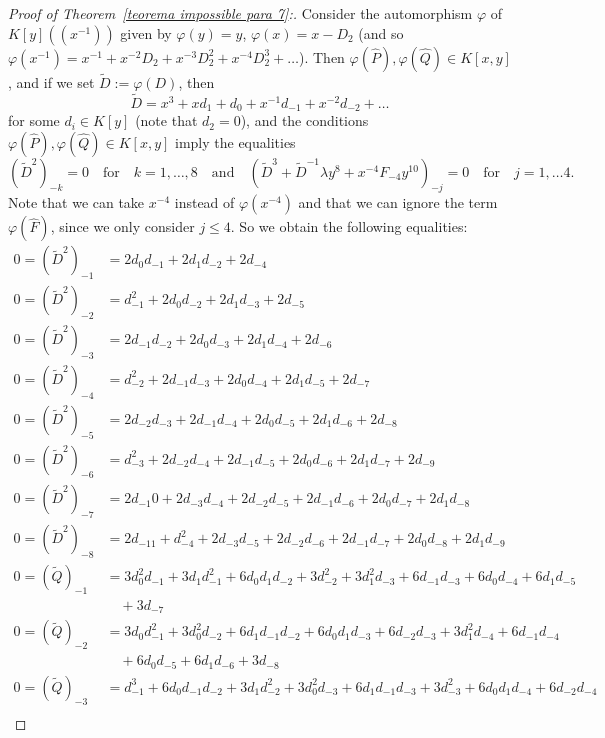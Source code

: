 \documentclass[reqno,a4paper,twoside]{amsart}
\theoremstyle{definition}
\theoremstyle{remark}
\begin{document}
\begin{proof}[Proof of Theorem~\ref{teorema impossible para 7}:]
Consider the automorphism $\varphi$ of $K[y]((x^{-1}))$ given by $\varphi(y)=y$, $\varphi(x)=x-D_2$ (and so $\varphi(x^{-1})=x^{-1}+x^{-2}D_2+x^{-3}D_2^2+x^{-4}D_2^3+\dots$).
Then $\varphi(\hat P),\varphi(\hat Q)\in K[x,y]$, and if we set $\tilde D:=\varphi(D)$, then
$$
\tilde D=x^3+x d_1 +d_0+x^{-1}d_{-1}+x^{-2}d_{-2}+\dots
$$
for some $d_i\in K[y]$ (note that $d_2=0$), and the conditions $\varphi(\hat P),\varphi(\hat Q)\in K[x,y]$ imply the equalities
$$
(\tilde D^2)_{-k}=0\quad\text{for}\quad k=1,\dots,8\quad\text{and}\quad (\tilde D^3+\tilde D^{-1}\lambda y^8+x^{-4}F_{-4}y^{10})_{-j}=0\quad\text{for}\quad j=1,\dots 4.
$$
Note that we can take $x^{-4}$ instead of $\varphi(x^{-4})$ and that we can ignore the term $\varphi(\hat F)$, since we only consider $j\le 4$.
So we obtain the following equalities:
\begin{align*}
  0=(\tilde D^2)_{-1} & = 2 d_0 d_{-1} + 2 d_1 d_{-2} + 2 d_{-4}\\
0=(\tilde D^2)_{-2} &= d_{-1}^2 + 2 d_0 d_{-2} + 2 d_1 d_{-3} + 2 d_{-5}\\
0=(\tilde D^2)_{-3} &= 2 d_{-1} d_{-2} + 2 d_0 d_{-3} + 2 d_1 d_{-4} + 2 d_{-6}\\
0=(\tilde D^2)_{-4} &= d_{-2}^2 + 2 d_{-1} d_{-3} + 2 d_0 d_{-4} + 2 d_1 d_{-5} + 2 d_{-7}\\
0=(\tilde D^2)_{-5} &= 2 d_{-2} d_{-3} + 2 d_{-1} d_{-4} + 2 d_0 d_{-5} + 2 d_1 d_{-6} + 2 d_{-8}\\
0=(\tilde D^2)_{-6} &= d_{-3}^2 + 2 d_{-2} d_{-4} + 2 d_{-1} d_{-5} + 2 d_0 d_{-6} + 2 d_1 d_{-7} + 2 d_{-9}\\
0=(\tilde D^2)_{-7} &= 2 d_{-1}0 + 2 d_{-3} d_{-4} + 2 d_{-2} d_{-5} + 2 d_{-1} d_{-6} + 2 d_0 d_{-7} +  2 d_1 d_{-8}\\
0=(\tilde D^2)_{-8} &= 2 d_{-11} + d_{-4}^2 + 2 d_{-3} d_{-5} + 2 d_{-2} d_{-6} + 2 d_{-1} d_{-7} + 2 d_0 d_{-8} + 2 d_1 d_{-9}\\
0=(\tilde Q)_{-1}&= 3 d_0^2 d_{-1} + 3 d_1 d_{-1}^2 + 6 d_0 d_1 d_{-2} + 3 d_{-2}^2 + 3 d_1^2 d_{-3} + 6 d_{-1} d_{-3} + 6 d_0 d_{-4} + 6 d_1 d_{-5}\\
&\quad + 3 d_{-7}\\
0=(\tilde Q)_{-2}&= 3 d_0 d_{-1}^2 + 3 d_0^2 d_{-2} + 6 d_1 d_{-1} d_{-2} + 6 d_0 d_1 d_{-3} +  6 d_{-2} d_{-3} + 3 d_1^2 d_{-4} + 6 d_{-1} d_{-4}\\
&\quad + 6 d_0 d_{-5} + 6 d_1 d_{-6} +  3 d_{-8}\\
0=(\tilde Q)_{-3}&= d_{-1}^3 + 6 d_0 d_{-1} d_{-2} + 3 d_1 d_{-2}^2 + 3 d_0^2 d_{-3} + 6 d_1 d_{-1} d_{-3} + 3 d_{-3}^2 + 6 d_0 d_1 d_{-4} + 6 d_{-2} d_{-4}\\

\end{align*}
\end{proof}
\end{document}
